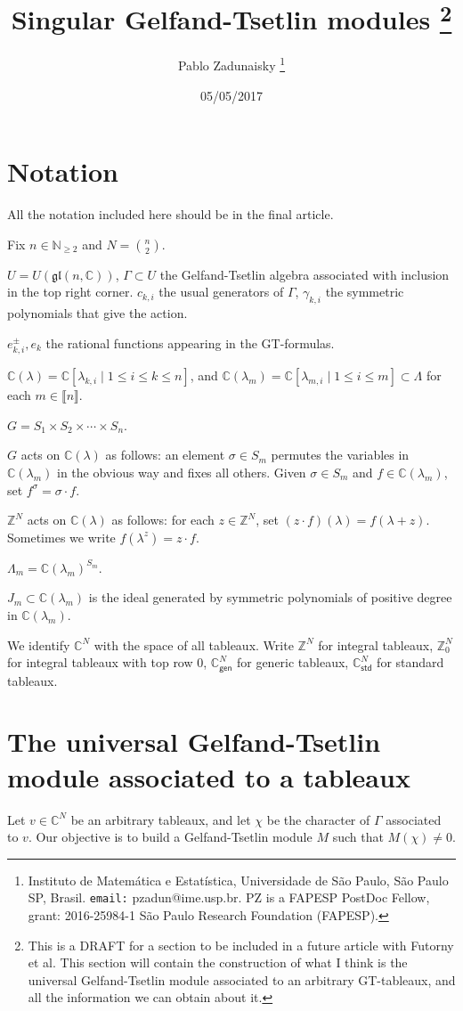 \documentclass[11pt,fleqn]{article}
\title{Singular Gelfand-Tsetlin modules
\footnote{
  This is a DRAFT for a section to be included in a future article with 
  Futorny et al. This section will contain the construction of what I think is 
  the universal Gelfand-Tsetlin module associated to an arbitrary GT-tableaux, 
  and all the information we can obtain about it.
  }
}
\author{Pablo Zadunaisky
\footnote{Instituto de Matem\'atica e Estat\'istica, Universidade de S\~ao
Paulo,  S\~ao Paulo SP, Brasil. \texttt{email:} pzadun@ime.usp.br.
PZ is a FAPESP PostDoc Fellow, grant: 2016-25984-1 
S\~ao Paulo Research Foundation (FAPESP).}
}
\date{05/05/2017}
\newcommand\NN{\mathbb N}
\newcommand\CC{\mathbb C}
\newcommand\ZZ{\mathbb Z}
\newcommand\gl{\mathfrak{gl}}
\newcommand\gen{\mathsf{gen}}
\newcommand\std{\mathsf{std}}
\newcommand\interval[1]{\llbracket #1 \rrbracket}
\begin{document}
\maketitle

\section*{Notation}

All the notation included here should be in the final article.

Fix $n \in \NN_{\geq 2}$ and $N = \binom{n}{2}$.

$U = U(\gl(n,\CC))$, $\Gamma \subset U$ the Gelfand-Tsetlin algebra associated
with inclusion in the top right corner. $c_{k,i}$ the usual generators of 
$\Gamma$, $\gamma_{k,i}$ the symmetric polynomials that give the action.

$e_{k,i}^\pm, e_k$ the rational functions appearing in the GT-formulas.

$\CC(\lambda) = \CC[\lambda_{k,i} \mid 1 \leq i \leq k \leq n]$, and 
$\CC(\lambda_m) = \CC[\lambda_{m,i} \mid 1 \leq i \leq m] \subset \Lambda$
for each $m \in \interval{n}$.

$G = S_1 \times S_2 \times \cdots \times S_n$.

$G$ acts on $\CC(\lambda)$ as follows: an element $\sigma \in S_m$ permutes 
the variables in $\CC(\lambda_m)$ in the obvious way and fixes all others. 
Given $\sigma \in S_m$ and $f \in \CC(\lambda_m)$, set $f^\sigma = \sigma 
\cdot f$.

$\ZZ^N$ acts on $\CC(\lambda)$ as follows: for each $z \in \ZZ^N$, set $(z 
\cdot f)(\lambda) = f(\lambda + z)$. Sometimes we write $f(\lambda^z) = z \cdot
f$.

$\Lambda_m = \CC(\lambda_m)^{S_m}$. 

$J_m \subset \CC(\lambda_m)$ is the ideal generated by symmetric polynomials of
positive degree in $\CC(\lambda_m)$.

We identify $\CC^N$ with the space of all tableaux. Write $\ZZ^N$ for integral 
tableaux, $\ZZ^N_0$ for integral tableaux with top row $0$, $\CC^N_\gen$ for 
generic tableaux, $\CC^N_\std$ for standard tableaux.

\section{The universal Gelfand-Tsetlin module associated to a tableaux}

Let $v \in \CC^N$ be an arbitrary tableaux, and let $\chi$ be the character of 
$\Gamma$ associated to $v$. Our objective is to build a Gelfand-Tsetlin module 
$M$ such that $M(\chi) \neq 0$. 
\end{document}
